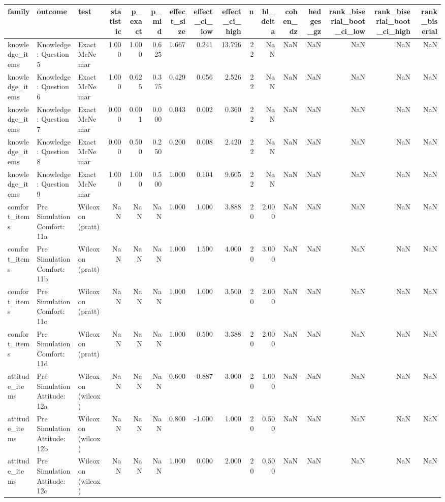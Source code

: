 \begin{tabular}{lllrrrrrrrrrrrrr}
\toprule
family & outcome & test & statistic & p_exact & p_mid & effect_size & effect_ci_low & effect_ci_high & n & hl_delta & cohen_dz & hedges_gz & rank_biserial_boot_ci_low & rank_biserial_boot_ci_high & rank_biserial \\
\midrule
knowledge_items & Knowledge: Question 5 & Exact McNemar & 1.000 & 1.000 & 0.625 & 1.667 & 0.241 & 13.796 & 22 & NaN & NaN & NaN & NaN & NaN & NaN \\
knowledge_items & Knowledge: Question 6 & Exact McNemar & 1.000 & 0.625 & 0.375 & 0.429 & 0.056 & 2.526 & 22 & NaN & NaN & NaN & NaN & NaN & NaN \\
knowledge_items & Knowledge: Question 7 & Exact McNemar & 0.000 & 0.001 & 0.000 & 0.043 & 0.002 & 0.360 & 22 & NaN & NaN & NaN & NaN & NaN & NaN \\
knowledge_items & Knowledge: Question 8 & Exact McNemar & 0.000 & 0.500 & 0.250 & 0.200 & 0.008 & 2.420 & 22 & NaN & NaN & NaN & NaN & NaN & NaN \\
knowledge_items & Knowledge: Question 9 & Exact McNemar & 1.000 & 1.000 & 0.500 & 1.000 & 0.104 & 9.605 & 22 & NaN & NaN & NaN & NaN & NaN & NaN \\
comfort_items & Pre Simulation Comfort: 11a & Wilcoxon (pratt) & NaN & NaN & NaN & 1.000 & 1.000 & 3.888 & 20 & 2.000 & NaN & NaN & NaN & NaN & NaN \\
comfort_items & Pre Simulation Comfort: 11b & Wilcoxon (pratt) & NaN & NaN & NaN & 1.000 & 1.500 & 4.000 & 20 & 3.000 & NaN & NaN & NaN & NaN & NaN \\
comfort_items & Pre Simulation Comfort: 11c & Wilcoxon (pratt) & NaN & NaN & NaN & 1.000 & 1.000 & 3.500 & 20 & 2.000 & NaN & NaN & NaN & NaN & NaN \\
comfort_items & Pre Simulation Comfort: 11d & Wilcoxon (pratt) & NaN & NaN & NaN & 1.000 & 0.500 & 3.388 & 20 & 2.000 & NaN & NaN & NaN & NaN & NaN \\
attitude_items & Pre Simulation Attitude: 12a & Wilcoxon (wilcox) & NaN & NaN & NaN & 0.600 & -0.887 & 3.000 & 20 & 1.000 & NaN & NaN & NaN & NaN & NaN \\
attitude_items & Pre Simulation Attitude: 12b & Wilcoxon (wilcox) & NaN & NaN & NaN & 0.800 & -1.000 & 1.000 & 20 & 0.500 & NaN & NaN & NaN & NaN & NaN \\
attitude_items & Pre Simulation Attitude: 12c & Wilcoxon (wilcox) & NaN & NaN & NaN & 1.000 & 0.000 & 2.000 & 20 & 0.500 & NaN & NaN & NaN & NaN & NaN \\

\end{tabular}
